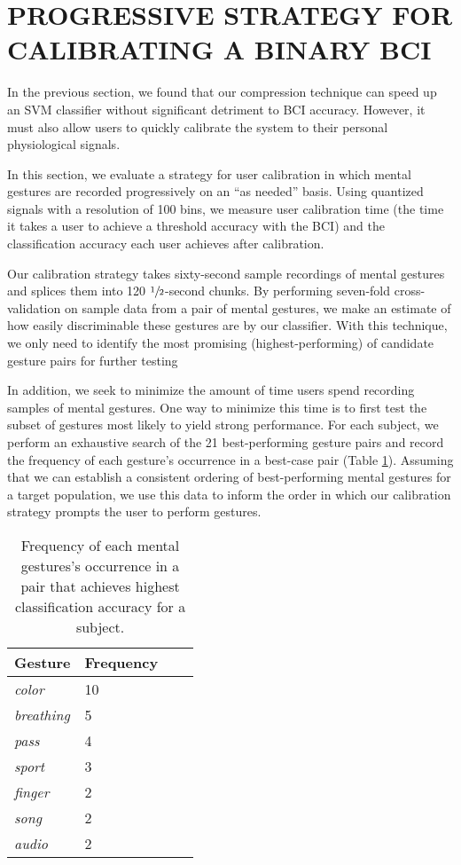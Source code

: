 \section{\uppercase{Progressive strategy for calibrating a binary BCI}}
\label{sec:calibration_eval}

\noindent In the previous section, we found that our compression technique can speed up an SVM classifier without significant detriment to BCI accuracy. However, it must also allow users to quickly calibrate the system to their personal physiological signals.

In this section, we evaluate a strategy for user calibration in which mental gestures are recorded progressively on an ``as needed'' basis. Using  quantized signals with a resolution of 100 bins, we measure user calibration time (the time it takes a user to achieve a threshold accuracy with the BCI) and the classification accuracy each user achieves after calibration. 

Our calibration strategy takes sixty-second sample recordings of mental gestures and splices them into 120 $\sfrac{1}{2}$-second chunks. By performing seven-fold cross-validation on sample data from a pair of mental gestures, we make an estimate of how easily discriminable these gestures are by our classifier. With this technique, we only need to identify the most promising (highest-performing) of candidate gesture pairs for further testing

In addition, we seek to minimize the amount of time users spend recording samples of mental gestures. One way to minimize this time is to first test the subset of gestures most likely to yield strong performance. For each subject, we perform an exhaustive search of the 21 best-performing gesture pairs and record the frequency of each gesture's occurrence in a best-case pair (Table \ref{table:name}). Assuming that we can establish a consistent ordering of best-performing mental gestures for a target population, we use this data to inform the order in which our calibration strategy prompts the user to perform gestures.


\begin{table}[!h]
  \centering
  \begin{tabular}{ | l | l | l | p{5cm} |}
  \hline
  Gesture & Frequency \\ \hline
  \textit{color} & 10 \\ \hline
  \textit{breathing} & 5 \\ \hline
  \textit{pass} & 4 \\ \hline
  \textit{sport} & 3 \\ \hline
  \textit{finger} & 2 \\ \hline
  \textit{song} & 2 \\ \hline
  \textit{audio} & 2 \\ \hline
  \end{tabular}
  \caption{Frequency of each mental gestures's occurrence in a pair that achieves highest classification accuracy for a subject.}
  \label{table:name}
\end{table}

